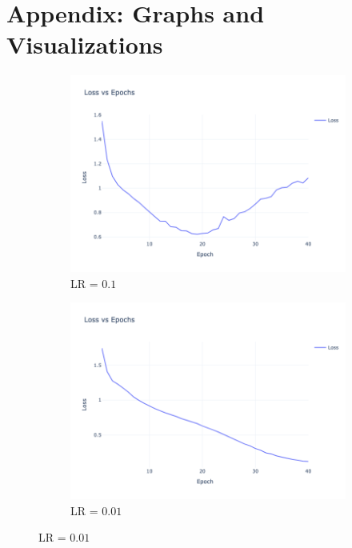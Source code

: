 \section{Appendix: Graphs and Visualizations}

\begin{figure}[htbp!]
    \centering
    \begin{subfigure}{0.32\textwidth}
    \centering
    \includegraphics[width=\textwidth]{images/CNN-3-train-loss-lr_0.1.png}
    \caption{LR = $0.1$}
    \end{subfigure}
    \begin{subfigure}{0.32\textwidth}
    \centering
    \includegraphics[width=\textwidth]{images/CNN-3-train-loss-lr_0.01.png}
    \caption{LR = $0.01$}
    \end{subfigure}

\end{figure}
